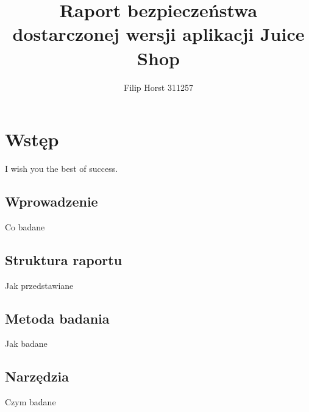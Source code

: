 \documentclass[journal,onecolumn]{IEEEtran}
\title{Raport bezpieczeństwa dostarczonej wersji aplikacji Juice Shop}
\author{Filip Horst 311257}%
\begin{document}
%
{}

\maketitle



\IEEEpeerreviewmaketitle



\section{Wstęp}


I wish you the best of success.

 

\subsection{Wprowadzenie}
Co badane

\subsection{Struktura raportu}
Jak przedstawiane

\subsection{Metoda badania}
Jak badane

\subsection{Narzędzia}
Czym badane
\end{document}
